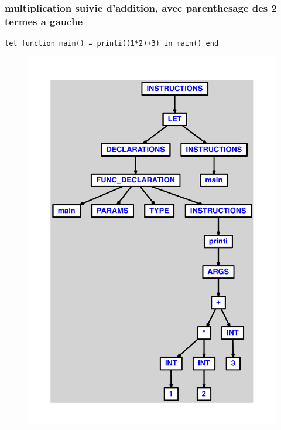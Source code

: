 \documentclass{article}
\begin{document}
\subsubsection{multiplication suivie d'addition, avec parenthesage des 2 termes a gauche}
\begin{lstlisting}
let function main() = printi((1*2)+3) in main() end
\end{lstlisting}
\newpage
\begin{figure}[H]
\centering
\includegraphics[max width=\textwidth]{ast/ast_99.pdf}
\end{figure}
\newpage
\end{document}
